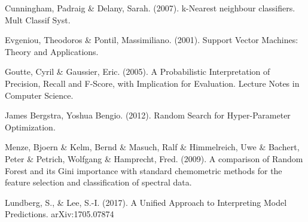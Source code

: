 \documentclass[runningheads]{llncs}
\begin{document}
\begin{thebibliography}{8}
Cunningham, Padraig \& Delany, Sarah. (2007). k-Nearest neighbour classifiers. Mult Classif Syst. 

Evgeniou, Theodoros \& Pontil, Massimiliano. (2001). Support Vector Machines: Theory and Applications.

Goutte, Cyril \& Gaussier, Eric. (2005). A Probabilistic Interpretation of Precision, Recall and F-Score, with Implication for Evaluation. Lecture Notes in Computer Science.

James Bergstra, Yoshua Bengio. (2012). Random Search for Hyper-Parameter Optimization.

Menze, Bjoern \& Kelm, Bernd \& Masuch, Ralf \& Himmelreich, Uwe \& Bachert, Peter \& Petrich, Wolfgang & Hamprecht, Fred. (2009). A comparison of Random Forest and its Gini importance with standard chemometric methods for the feature selection and classification of spectral data.

Lundberg, S., \& Lee, S.-I. (2017). A Unified Approach to Interpreting Model Predictions. arXiv:1705.07874

\end{thebibliography}
\end{document}
